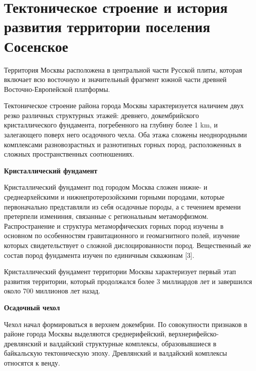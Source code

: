 \section{Тектоническое строение и история развития территории поселения Сосенское}\label{sec:ch2/sec2}

Территория Москвы расположена  в центральной части
Русской плиты, которая включает всю восточную и значительный фрагмент южной части древней
Восточно-Европейской платформы. 

Тектоническое строение района города Москвы характеризуется наличием двух резко различных
структурных этажей: древнего, докембрийского кристаллического фундамента, погребенного 
на глубину более 1 \si{\kilo\meter}, и залегающего поверх него осадочного чехла.
Оба этажа сложены неоднородными комплексами разновозрастных и разнотипных горных пород, 
расположенных в сложных пространственных соотношениях.

\textbf{Кристаллический фундамент}

Кристаллический фундамент под городом Москва сложен нижне- и среднеархейскими и 
нижнепротерозойскими горными породами, которые первоначально представляли из себя 
осадочные породы, а с течением времени претерпели измениния, связанные с региональным 
метаморфизмом. Распространение и структура метаморфических горных пород изучены в 
основном по особенностям гравитационного и геомагнитного полей, изучение которых свидетельствует 
о сложной дислоцированности пород. Вещественный же состав пород фундамента изучен по 
единичным скважинам [3]. 

Кристаллический фундамент территории Москвы характеризует первый этап развития территории,
который продолжался более 3 миллиардов лет и завершился около 700 миллионов лет назад.

\textbf{Осадочный чехол}

Чехол начал формироваться в верхнем докембрии. По совокупности 
признаков в районе города Москвы выделяются среднерифейский, верхнерифейско-древлянский 
и валдайский структурные комплексы, образовывшиеся в байкальскую тектоническую эпоху. 
Древлянский и валдайский комплексы относятся к венду.

